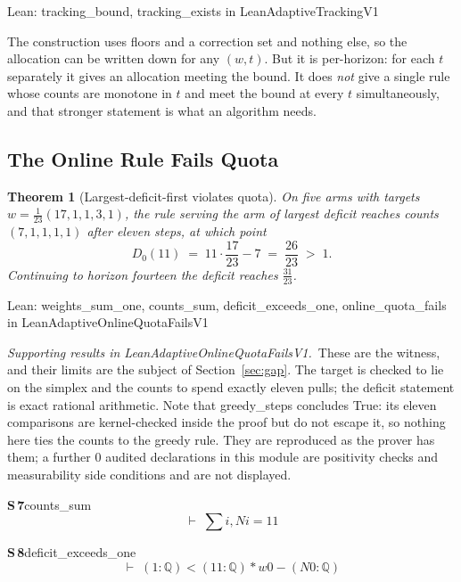 \documentclass[conference]{IEEEtran}
\newtheorem{theorem}{Theorem}
\theoremstyle{definition}
\newcommand{\lean}[1]{\textsf{\footnotesize #1}}
\newcommand{\leanbox}[1]{%
  \par\vspace{2pt}\noindent
  {\footnotesize\textsf{Lean: #1}}\par\vspace{2pt}}
\begin{document}
\leanbox{\lean{tracking\_bound}, \lean{tracking\_exists} in \lean{LeanAdaptiveTrackingV1}}

The construction uses floors and a correction set and nothing else, so the allocation can be
written down for any $(w,t)$. But it is per-horizon: for each $t$ separately it gives an
allocation meeting the bound. It does \emph{not} give a single rule whose counts are monotone
in $t$ and meet the bound at every $t$ simultaneously, and that stronger statement is what an
algorithm needs.

\subsection{The Online Rule Fails Quota}
\label{sec:fails}

\begin{theorem}[Largest-deficit-first violates quota]
\label{thm:quotafails}
On five arms with targets $w=\frac{1}{23}(17,1,1,3,1)$, the rule serving the arm of largest
deficit reaches counts $(7,1,1,1,1)$ after eleven steps, at which point
\begin{equation}
D_{0}(11)\;=\;11\cdot\frac{17}{23}-7\;=\;\frac{26}{23}\;>\;1 .
\label{eq:quotafail}
\end{equation}
Continuing to horizon fourteen the deficit reaches $\frac{31}{23}$.
\end{theorem}

\leanbox{\lean{weights\_sum\_one}, \lean{counts\_sum}, \lean{deficit\_exceeds\_one},
\lean{online\_quota\_fails} in \lean{LeanAdaptiveOnlineQuotaFailsV1}}

\noindent\emph{Supporting results in \lean{LeanAdaptiveOnlineQuotaFailsV1}.}~These are the witness, and their limits are the subject of Section~\ref{sec:gap}. The target is checked to lie on the simplex and the counts to spend exactly eleven pulls; the deficit statement is exact rational arithmetic. Note that \lean{greedy\_steps} concludes \lean{True}: its eleven comparisons are kernel-checked inside the proof but do not escape it, so nothing here ties the counts to the greedy rule. They are reproduced as the prover has them; a further $0$ audited declarations in this module are positivity checks and measurability side conditions and are not displayed.

\noindent\textbf{S\,7}\quad\lean{counts\_sum}
{\footnotesize\[ \vdash\; \textstyle\sum \mathit{i}, \mathit{N} \mathit{i} = 11 \]}

\noindent\textbf{S\,8}\quad\lean{deficit\_exceeds\_one}
{\footnotesize\[ \vdash\; (1 : \mathbb{Q} ) < (11 : \mathbb{Q} ) * \mathit{w} 0 - (\mathit{N} 0 : \mathbb{Q} ) \]}
\end{document}
